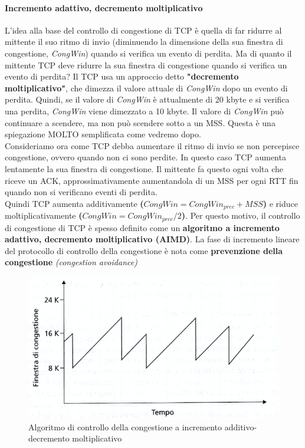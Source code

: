 \documentclass[11pt,a4paper]{book}
\begin{document}
\paragraph{Incremento adattivo, decremento moltiplicativo}
L'idea alla base del controllo di congestione di TCP è quella di far ridurre al mittente il suo ritmo di invio (diminuendo la dimensione della sua finestra di congestione, \emph{CongWin}) quando si verifica un evento di perdita. Ma di quanto il mittente TCP deve ridurre la sua finestra di congestione quando si verifica un evento di perdita? Il TCP usa un approccio detto \textbf{"decremento moltiplicativo"}, che dimezza il valore attuale di \emph{CongWin} dopo un evento di perdita. Quindi, se il valore di \emph{CongWin} è attualmente di 20 kbyte e si verifica una perdita, \emph{CongWin} viene dimezzato a 10 kbyte. Il valore di \emph{CongWin} può continuare a scendere, ma non può scendere sotto a un MSS. Questa è una spiegazione MOLTO semplificata come vedremo dopo. \\
Consideriamo ora come TCP debba aumentare il ritmo di invio se non percepisce congestione, ovvero quando non ci sono perdite. In questo caso TCP aumenta lentamente la sua finestra di congestione. Il mittente fa questo ogni volta che riceve un ACK, approssimativamente aumentandola di un MSS per ogni RTT fin quando non si verificano eventi di perdita. \\
Quindi TCP aumenta additivamente \textbf{($CongWin = CongWin_{prec} + MSS$)} e riduce moltiplicativamente \textbf{($CongWin = CongWin_{prec}/2$)}. Per questo motivo, il controllo di congestione di TCP è spesso definito come un \textbf{algoritmo a incremento adattivo, decremento moltiplicativo (AIMD)}. La fase di incremento lineare del protocollo di controllo della congestione è nota come \textbf{prevenzione della congestione} \textit{(congestion avoidance)}
\begin{figure}
	\includegraphics[scale=0.6]{img/045.png}
	\caption{Algoritmo di controllo della congestione a incremento additivo-decremento moltiplicativo}
\end{figure}
\end{document}
